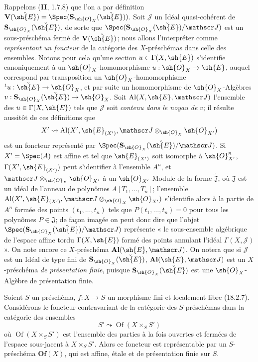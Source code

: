 \begin{env}[18.5.2]
\label{IV.18.5.2}
Rappelons (\textbf{II}, 1.7.8) que l'on a par définition $\mathbf V(\check{\sh{E}})=\Spec(\mathbf S_{\sh{O}_X}(\check{\sh{E}}))$. Soit $\mathscr J$ un Idéal quasi-cohérent de $\mathbf S_{\sh{O}_X}(\check{\sh{E}})$, de sorte que $\Spec(\mathbf S_{\sh{O}_X}(\check{\sh{E}})/\mathscr J)$ est un sous-préschéma fermé de $\mathbf V(\check{\sh{E}})$; nous allons l'interpréter comme \emph{représentant un foncteur} de la catégorie des $X$-préschémas dans celle des ensembles. Notons pour cela qu'une section $u\in\Gamma(X,\sh{E})$ s'identifie canoniquement à un $\sh{O}_X$-homomorphisme $u:\sh{O}_X\to\sh{E}$, auquel correspond par transposition un $\sh{O}_X$-homomorphisme ${}^t u:\check{\sh{E}}\to\sh{O}_X$, et par suite un homomorphisme de $\sh{O}_X$-Algèbres $v:\mathbf S_{\sh{O}_X}(\check{\sh{E}})\to\sh{O}_X$. Soit $\operatorname{Al}(X,\sh{E},\mathscr J)$ l'ensemble des $u\in\Gamma(X,\sh{E})$ tels que $\mathscr J$ soit \emph{contenu dans le noyau de} $v$; il résulte aussitôt de ces définitions que
\[
  X'\leadsto\operatorname{Al}(X',\sh{E}_{(X')},\mathscr J\otimes_{\sh{O}_X}\sh{O}_{X'})
\]
est un foncteur représenté par $\Spec(\mathbf S_{\sh{O}_X}(\check{\sh{E}})/\mathscr J)$. Si $X'=\Spec(A)$ est affine et tel que $\sh{E}_{(X')}$ soit isomorphe à $\sh{O}_{X'}^n$, $\Gamma(X',\sh{E}_{(X')})$ peut s'identifier à l'ensemble $A^n$, et $\mathscr J\otimes_{\sh{O}_X}\sh{O}_{X'}$ à un $\sh{O}_{X'}$-Module de la forme $\widetilde{\mathfrak J}$, où $\mathfrak J$ est un idéal de l'anneau de polynômes $A[T_1,\ldots,T_n]$; l'ensemble $\operatorname{Al}(X',\sh{E}_{(X')},\mathscr J\otimes_{\sh{O}_X}\sh{O}_{X'})$ s'identifie alors à la partie de $A^n$ formée des points $(t_1,\ldots,t_n)$ tels que $P(t_1,\ldots,t_n)=0$ pour tous les polynômes $P\in\mathfrak J$; de façon imagée on peut donc dire que l'objet $\Spec(\mathbf S_{\sh{O}_X}(\check{\sh{E}})/\mathscr J)$ représente « le sous-ensemble algébrique de l'espace affine tordu $\Gamma(X,\sh{E})$ formé des points annulant l'idéal $\Gamma(X,\mathscr J)$ ». On note encore ce $X$-préschéma $\mathbf{Al}(\sh{E},\mathscr J)$. On notera que si $\mathscr J$ est un Idéal de type fini de $\mathbf S_{\sh{O}_X}(\check{\sh{E}})$, $\mathbf{Al}(\sh{E},\mathscr J)$ est un $X$-préschéma \emph{de présentation finie}, puisque $\mathbf S_{\sh{O}_X}(\check{\sh{E}})$ est une $\sh{O}_X$-Algèbre de présentation finie.
\end{env}

\begin{lemma}[18.5.3]
\label{IV.18.5.3}
Soient $S$ un préschéma, $f:X\to S$ un morphisme fini et localement libre \textup{(18.2.7)}. Considérons le foncteur contravariant de la catégorie des $S$-préschémas dans la catégorie des ensembles
\begin{equation}
  S'\leadsto\operatorname{Of}(X\times_S S')
  \tag{18.5.3.1}\label{IV.18.5.3.1}
\end{equation}
où $\operatorname{Of}(X\times_S S')$ est l'ensemble des parties à la fois ouvertes et fermées de l'espace sous-jacent à $X\times_S S'$. Alors ce foncteur est représentable par un $S$-préschéma $\mathbf{Of}(X)$, qui est affine, étale et de présentation finie sur $S$.
\end{lemma}

